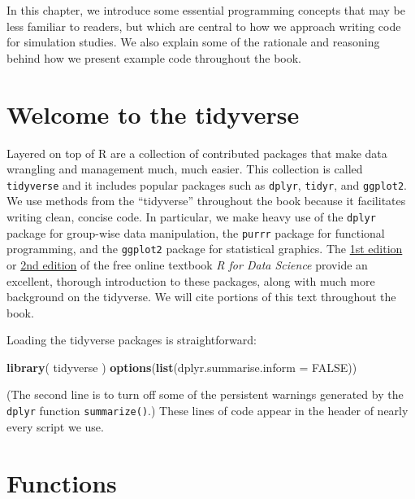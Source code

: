 \documentclass[
]{book}
\newenvironment{Shaded}{\begin{snugshade}}{\end{snugshade}}
\newcommand{\AttributeTok}[1]{\textcolor[rgb]{0.13,0.29,0.53}{#1}}
\newcommand{\ConstantTok}[1]{\textcolor[rgb]{0.56,0.35,0.01}{#1}}
\newcommand{\FunctionTok}[1]{\textcolor[rgb]{0.13,0.29,0.53}{\textbf{#1}}}
\newcommand{\NormalTok}[1]{#1}
\begin{document}
In this chapter, we introduce some essential programming concepts that may be less familiar to readers, but which are central to how we approach writing code for simulation studies.
We also explain some of the rationale and reasoning behind how we present example code throughout the book.

\section{Welcome to the tidyverse}\label{welcome-to-the-tidyverse}

Layered on top of R are a collection of contributed packages that make data wrangling and management much, much easier.
This collection is called \texttt{tidyverse} and it includes popular packages such as \texttt{dplyr}, \texttt{tidyr}, and \texttt{ggplot2}.
We use methods from the ``tidyverse'' throughout the book because it facilitates writing clean, concise code.
In particular, we make heavy use of the \texttt{dplyr} package for group-wise data manipulation, the \texttt{purrr} package for functional programming, and the \texttt{ggplot2} package for statistical graphics.
The \href{https://r4ds.had.co.nz/}{1st edition} or \href{https://r4ds.hadley.nz/}{2nd edition} of the free online textbook \emph{R for Data Science} provide an excellent, thorough introduction to these packages, along with much more background on the tidyverse.
We will cite portions of this text throughout the book.

Loading the tidyverse packages is straightforward:

\begin{Shaded}
\begin{Highlighting}[]
\FunctionTok{library}\NormalTok{( tidyverse )}
\FunctionTok{options}\NormalTok{(}\FunctionTok{list}\NormalTok{(}\AttributeTok{dplyr.summarise.inform =} \ConstantTok{FALSE}\NormalTok{))}
\end{Highlighting}
\end{Shaded}

(The second line is to turn off some of the persistent warnings generated by the \texttt{dplyr} function \texttt{summarize()}.)
These lines of code appear in the header of nearly every script we use.

\section{Functions}\label{functions}
\end{document}
